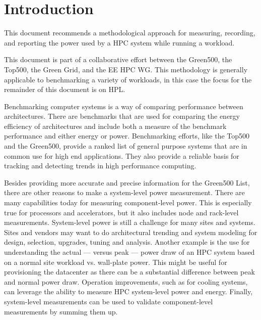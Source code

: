 \chapter{Introduction}
\label{sec:intro}

This document recommends a methodological approach for measuring, recording, and reporting the power used by a \ac{HPC} system while running a workload.

This document is part of a collaborative effort between the Green500, the Top500, the Green Grid, and the \ac{EE HPC WG}.
This methodology is generally applicable to benchmarking a variety of workloads, in this case the focus for the remainder of this document is on \ac{HPL}.

Benchmarking computer systems is a way of comparing performance between architectures.
There are benchmarks that are used for comparing the energy efficiency of architectures and include both a measure of the benchmark performance and either energy or power.
Benchmarking efforts, like the Top500 and the Green500, provide a ranked list of general purpose systems that are in common use for high end applications.
They also provide a reliable basis for tracking and detecting trends in high performance computing.

Besides providing more accurate and precise information for the Green500 List, there are other reasons to make a system-level power measurement.
There are many capabilities today for measuring component-level power.
This is especially true for processors and accelerators, but it also includes node and rack-level measurements.
System-level power is still a challenge for many sites and systems.
Sites and vendors may want to do architectural trending and system modeling for design, selection, upgrades, tuning and analysis.
Another example is the use for understanding the actual --- versus peak --- power draw of an HPC system based on a normal site workload vs. wall-plate power.
This might be useful for provisioning the datacenter as there can be a substantial difference between peak and normal power draw. Operation improvements, such as for cooling systems, can leverage the ability to measure HPC system-level power and energy.
Finally, system-level measurements can be used to validate component-level measurements by summing them up.


